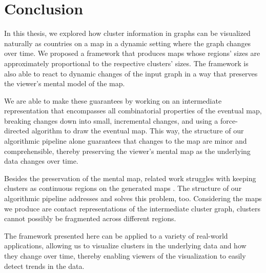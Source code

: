 \chapter{Conclusion}
\label{chap:conclusion}

In this thesis, we explored how cluster information in graphs can be visualized naturally as countries on a map in a dynamic setting where the graph changes over time.
We proposed a framework that produces maps whose regions' sizes are approximately proportional to the respective clusters' sizes.
The framework is also able to react to dynamic changes of the input graph in a way that preserves the viewer's mental model of the map.

We are able to make these guarantees by working on an intermediate representation that encompasses all combinatorial properties of the eventual map, breaking changes down into small, incremental changes, and using a force-directed algorithm to draw the eventual map.
This way, the structure of our algorithmic pipeline alone guarantees that changes to the map are minor and comprehensible, thereby preserving the viewer's mental map as the underlying data changes over time.

Besides the preservation of the mental map, related work struggles with keeping clusters as continuous regions on the generated maps \cite{gansner2009gmap} \cite{mashima2011visualizing}.
The structure of our algorithmic pipeline addresses and solves this problem, too.
Considering the maps we produce are contact representations of the intermediate cluster graph, clusters cannot possibly be fragmented across different regions.

The framework presented here can be applied to a variety of real-world applications, allowing us to visualize clusters in the underlying data and how they change over time, thereby enabling viewers of the visualization to easily detect trends in the data.



